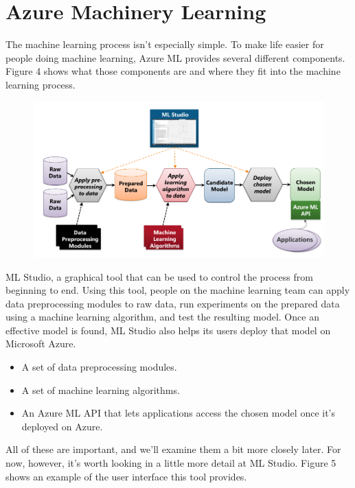 \documentclass[11pt]{article}
\begin{document}
\newpage

\section {Azure Machinery Learning}

The machine learning process isn’t especially simple. To make life easier for people doing machine learning, Azure ML provides several different components. Figure 4 shows what those components are and where they fit into the machine learning process.  


\begin{figure}[htp]
\centering
\includegraphics[width=13cm]{d.jpg}
\label{fig:lion}
\end{figure}


ML Studio, a graphical tool that can be used to control the process from beginning to end. Using this tool, people on the machine learning team can apply data preprocessing modules to raw data, run experiments on the prepared data using a machine learning algorithm, and test the resulting model. Once an effective model is found, ML Studio also helps its users deploy that model on Microsoft Azure.\\

\begin{itemize}
  \item A set of data preprocessing modules.
  \item A set of machine learning algorithms.  
  \item An Azure ML API that lets applications access the chosen model once it’s deployed on Azure.
\end{itemize}

All of these are important, and we’ll examine them a bit more closely later. For now, however, it’s worth looking in a little more detail at ML Studio. Figure 5 shows an example of the user interface this tool provides.  
\end{document}
